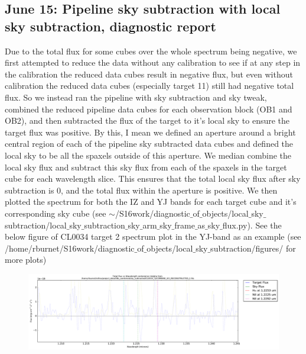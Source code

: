 \documentclass[10pt,letterpaper]{article}
\begin{document}
\subsection{June 15: Pipeline sky subtraction with local sky subtraction, diagnostic report}
Due to the total flux for some cubes over the whole spectrum being negative, we first attempted to reduce the data without any calibration to see if at any step in the calibration the reduced data cubes result in negative flux, but even without calibration the reduced data cubes (especially target 11) still had negative total flux. So we instead ran the pipeline with sky subtraction and sky tweak, combined the reduced pipeline data cubes for each observation block (OB1 and OB2), and then subtracted the flux of the target to it's local sky to ensure the target flux was positive. By this, I mean we defined an aperture around a bright central region of each of the pipeline sky subtracted data cubes and defined the local sky to be all the spaxels outside of this aperture. We median combine the local sky flux and subtract this sky flux from each of the spaxels in the target cube for each wavelength slice. This ensures that the total local sky flux after sky subtraction is 0, and the total flux within the aperture is positive. We then plotted the spectrum for both the IZ and YJ bands for each target cube and it's corresponding sky cube (see $\sim$/S16work/diagnostic$\_$of$\_$objects/local$\_$sky$\_$subtraction/local$\_$sky$\_$subtraction$\_$sky$\_$arm$\_$sky$\_$frame$\_$as$\_$sky$\_$flux.py). See the below figure of CL0034 target 2 spectrum plot in the YJ-band as an example (see \\/home/rburnet/S16work/diagnostic$\_$of$\_$objects/local$\_$sky$\_$subtraction/figures/ for more plots)\\

\begin{figure}[h!]
\includegraphics[scale=0.4]{figures/COMBINE_SCI_RECONSTRUCTED_2_Halpha.pdf}
\end{figure}
\end{document}
